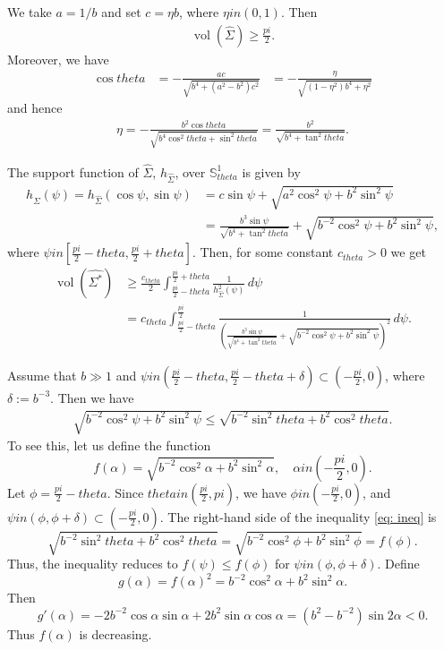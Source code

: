 \documentclass[12pt]{amsart}
\def\theta{theta}%
\def\pi{pi}%
\def\in{in }%
\numberwithin{equation}{section}
\newcommand{\wh}{\widehat}
\newcommand{\bbS}{\mathbb{S}}
\newcommand{\8}{\infty}
\newcommand{\al}{\alpha}
\newcommand{\de}{\delta}
\newcommand{\Si}{\Sigma}
\newcommand{\rt}{\sqrt}
\DeclareMathOperator{\vol}{vol}
\renewcommand{\(}{\left(}
\renewcommand{\)}{\right)}
\newcommand{\eq}[1]{\begin{equation}\begin{alignedat}{2} #1 \end{alignedat}\end{equation}}
\newcommand{\q}{\quad}
\begin{document}
We take $a=1/b$ and set $c = \eta b$, where $\eta \in (0, 1)$. Then
\eq{
\vol(\wh{\Si}) \geq \frac{\pi}{2}.
}
Moreover, we have
\eq{
\cos \theta &=- \frac{ac}{\sqrt{b^4+(a^2-b^2)c^2}}
&= -\frac{\eta}{\rt{(1 - \eta^2)b^4 + \eta^2}}
}
and hence
\eq{
\eta = -\frac{b^2 \cos\theta}{\rt{b^4 \cos^2 \theta + \sin^2 \theta}} = \frac{b^2}{\rt{b^4 + \tan^2 \theta}}.
}

The support function of $\wh{\Si}$, $h_{\wh{\Si}}$, over $\bbS_{\theta}^1$ is given by 
\eq{
h_{\wh{\Si}}(\psi)=h_{\wh{\Si}}(\cos \psi,\sin \psi) &=c \sin \psi+\sqrt{a^2 \cos^2 \psi+b^2\sin^2 \psi}\\
&=\frac{b^3 \sin \psi}{\sqrt{b^4+\tan^2\theta}}+\sqrt{b^{-2}\cos^2 \psi+b^2\sin^2 \psi},
}
where $\psi \in [\frac{\pi}{2}-\theta,\frac{\pi}{2}+\theta]$.
Then, for some constant $c_{\theta}>0$ we get
\eq{
\vol(\wh{\Si^{\ast}}) &\geq \frac{c_{\theta}}{2}\int_{\frac{\pi}{2}-\theta}^{\frac{\pi}{2}+\theta} \frac{1}{h_{\wh{\Si}}^2(\psi)} \, d\psi \\
&=c_{\theta} \int_{\frac{\pi}{2}-\theta}^{\frac{\pi}{2}} \frac{1}{(\frac{b^3 \sin \psi}{\sqrt{b^4+\tan^2\theta}}+\sqrt{b^{-2}\cos^2 \psi+b^2\sin^2 \psi})^2} \,d\psi.
}


Assume that $b\gg1$ and $\psi\in (\frac{\pi}{2}-\theta,\frac{\pi}{2}-\theta+\de)\subset (-\frac{\pi}{2},0)$, where $\de:=b^{-3}$. Then we have
\eq{\label{eq: ineq}
\sqrt{b^{-2} \cos^2 \psi + b^2 \sin^2 \psi} \leq \sqrt{b^{-2} \sin^2 \theta + b^2 \cos^2 \theta}.
}
To see this, let us define the function
\[
f(\alpha) = \sqrt{b^{-2} \cos^2 \alpha + b^2 \sin^2 \alpha},\q  \alpha \in ( -\frac{\pi}{2}, 0 ).
\]
Let $ \phi = \frac{\pi}{2} - \theta $. Since $ \theta \in \left( \frac{\pi}{2}, \pi \right) $, we have $ \phi \in \left( -\frac{\pi}{2}, 0 \right) $, and $ \psi \in (\phi, \phi + \delta) \subset \left( -\frac{\pi}{2}, 0 \right) $. The right-hand side of the inequality \eqref{eq: ineq} is
\[
\sqrt{b^{-2} \sin^2 \theta + b^2 \cos^2 \theta} = \sqrt{b^{-2} \cos^2 \phi + b^2 \sin^2 \phi} = f(\phi).
\]
Thus, the inequality reduces to $ f(\psi) \leq f(\phi) $ for $\psi \in (\phi, \phi + \delta)$. Define
\[
g(\alpha) = f(\alpha)^2 = b^{-2} \cos^2 \alpha + b^2 \sin^2 \alpha.
\]
Then
\[
g'(\alpha)  = -2 b^{-2} \cos \alpha \sin \alpha + 2 b^2 \sin \alpha \cos \alpha =   (b^2 - b^{-2})\sin 2\al<0.
\]
Thus $ f(\alpha) $ is decreasing.
\end{document}
